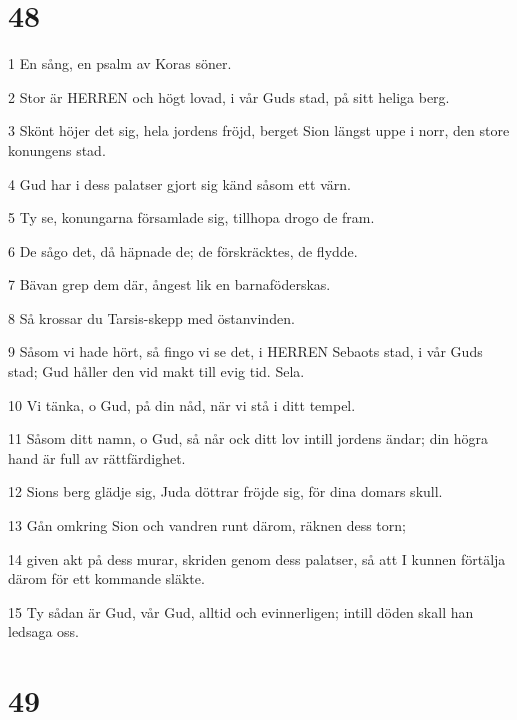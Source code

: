 \chapter{48}

\par 1 En sång, en psalm av Koras söner.
\par 2 Stor är HERREN och högt lovad, i vår Guds stad, på sitt heliga berg.
\par 3 Skönt höjer det sig, hela jordens fröjd, berget Sion längst uppe i norr, den store konungens stad.
\par 4 Gud har i dess palatser gjort sig känd såsom ett värn.
\par 5 Ty se, konungarna församlade sig, tillhopa drogo de fram.
\par 6 De sågo det, då häpnade de; de förskräcktes, de flydde.
\par 7 Bävan grep dem där, ångest lik en barnaföderskas.
\par 8 Så krossar du Tarsis-skepp med östanvinden.
\par 9 Såsom vi hade hört, så fingo vi se det, i HERREN Sebaots stad, i vår Guds stad; Gud håller den vid makt till evig tid. Sela.
\par 10 Vi tänka, o Gud, på din nåd, när vi stå i ditt tempel.
\par 11 Såsom ditt namn, o Gud, så når ock ditt lov intill jordens ändar; din högra hand är full av rättfärdighet.
\par 12 Sions berg glädje sig, Juda döttrar fröjde sig, för dina domars skull.
\par 13 Gån omkring Sion och vandren runt därom, räknen dess torn;
\par 14 given akt på dess murar, skriden genom dess palatser, så att I kunnen förtälja därom för ett kommande släkte.
\par 15 Ty sådan är Gud, vår Gud, alltid och evinnerligen; intill döden skall han ledsaga oss.

\chapter{49}


